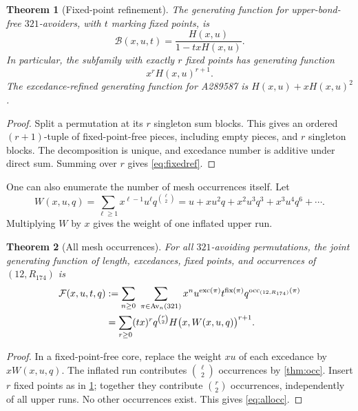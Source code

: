 \documentclass[11pt,letterpaper]{article}
\numberwithin{equation}{section}
\newtheorem{theorem}{Theorem}[section]
\theoremstyle{definition}
\DeclareMathOperator{\Av}{Av}
\DeclareMathOperator{\exc}{exc}
\DeclareMathOperator{\fix}{fix}
\DeclareMathOperator{\occ}{occ}
\newcommand{\Rone}{R_{174}}
\begin{document}
\begin{theorem}[Fixed-point refinement]
\label{thm:fixedref}
The generating function for upper-bond-free $321$-avoiders, with $t$
marking fixed points, is
\begin{equation}
 \mathcal B(x,u,t)
   =\frac{H(x,u)}{1-txH(x,u)}.
 \label{eq:fixedref}
\end{equation}
In particular, the subfamily with exactly $r$ fixed points has generating
function
\begin{equation}
 x^rH(x,u)^{r+1}.
 \label{eq:exactr}
\end{equation}
The excedance-refined generating function for A289587 is
$H(x,u)+xH(x,u)^2$.
\end{theorem}
\begin{proof}
Split a permutation at its $r$ singleton sum blocks. This gives an
ordered $(r+1)$-tuple of fixed-point-free pieces, including empty pieces,
and $r$ singleton blocks. The decomposition is unique, and excedance
number is additive under direct sum. Summing over $r$ gives
\eqref{eq:fixedref}.
\end{proof}

One can also enumerate the number of mesh occurrences itself.
Let
\begin{equation}
 W(x,u,q)=\sum_{\ell\ge1}x^{\ell-1}u^\ell q^{\binom\ell2}
  =u+xu^2q+x^2u^3q^3+x^3u^4q^6+\cdots.
 \label{eq:W}
\end{equation}
Multiplying $W$ by $x$ gives the weight of one inflated upper run.

\begin{theorem}[All mesh occurrences]
\label{thm:allocc}
For all $321$-avoiding permutations, the joint generating function of
length, excedances, fixed points, and occurrences of $(12,\Rone)$ is
\begin{align}
 \mathcal F(x,u,t,q)
 &:=\sum_{n\ge0}\ \sum_{\pi\in\Av_n(321)}
 x^n u^{\exc(\pi)}t^{\fix(\pi)}q^{\occ_{(12,\Rone)}(\pi)}\notag\\
 &=\sum_{r\ge0}(tx)^r q^{\binom r2}
       H\bigl(x,W(x,u,q)\bigr)^{r+1}.
 \label{eq:allocc}
\end{align}
\end{theorem}
\begin{proof}
In a fixed-point-free core, replace the weight $xu$ of each excedance by
$xW(x,u,q)$. The inflated run contributes $\binom\ell2$ occurrences by
\cref{thm:occ}. Insert $r$ fixed points as in \cref{thm:fixedref};
together they contribute $\binom r2$ occurrences, independently of all
upper runs. No other occurrences exist. This gives \eqref{eq:allocc}.
\end{proof}
\end{document}
